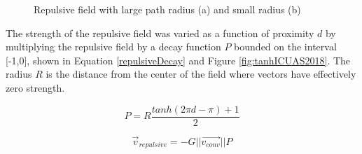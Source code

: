 \documentclass[numbered,pdftex]{ohio-etd}
\begin{document}
\begin{figure}[H]
	\begin{subfigmatrix}{2}%
		\centering	
		\hspace*{0mm}
	\end{subfigmatrix}
	\caption{Repulsive field with large path radius (a) and small radius (b)}
	\label{fig:gvfRepulsiveRadius}
\end{figure}

The strength of the repulsive field was varied as a function of proximity $d$ by multiplying the repulsive field by a decay function $P$ bounded on the interval [-1,0], shown in Equation \ref{repulsiveDecay} and Figure \ref{fig:tanhICUAS2018}. The radius $R$ is the distance from the center of the field where vectors have effectively zero strength. 

\begin{equation}
P = R\frac{tanh(2\pi d-\pi)+1}{2}
\label{repulsiveDecay}
\end{equation}

\begin{equation}
\vec{v}_{repulsive} = -G||\vec{v_{conv}}||P
\label{replulsiveField}
\end{equation}
\end{document}
